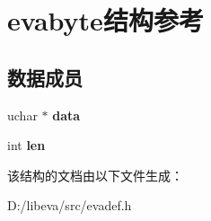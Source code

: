 \hypertarget{structevabyte}{\section{evabyte结构参考}
\label{structevabyte}
}
\subsection*{数据成员}
\begin{DoxyCompactItemize}
\item 
\hypertarget{structevabyte_ad05eda5be1163677025521db6710a3ba}{uchar $\ast$ {\bfseries data}}\label{structevabyte_ad05eda5be1163677025521db6710a3ba}

\item 
\hypertarget{structevabyte_afed088663f8704004425cdae2120b9b3}{int {\bfseries len}}\label{structevabyte_afed088663f8704004425cdae2120b9b3}

\end{DoxyCompactItemize}


该结构的文档由以下文件生成：\begin{DoxyCompactItemize}
\item 
\-D\-:/libeva/src/evadef.\-h\end{DoxyCompactItemize}
